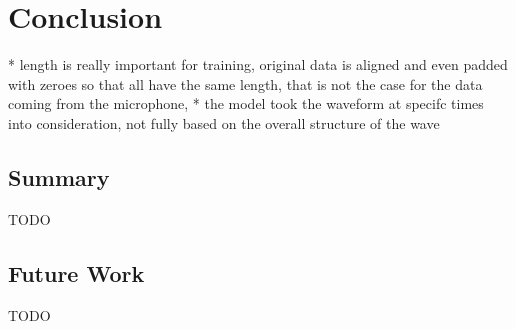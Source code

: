 \chapter{Conclusion}
* length is really important for training, original data is aligned and even padded with zeroes so that all have the same length,
that is not the case for the data coming from the microphone, 
* the model took the waveform at specifc times into consideration, not fully based on the overall structure of the wave

\section{Summary}
TODO

\section{Future Work}
TODO